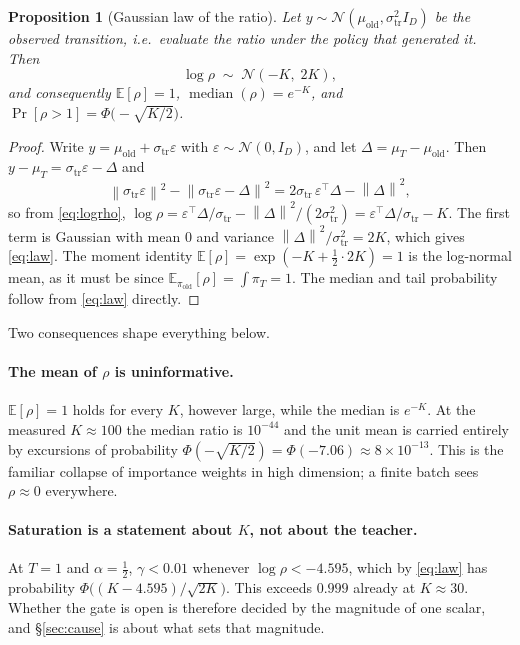 \documentclass[11pt,a4paper]{article}
\newcommand{\E}{\mathbb{E}}
\newcommand{\norm}[1]{\left\lVert #1 \right\rVert}
\newcommand{\N}{\mathcal{N}}
\newcommand{\str}{\sigma_{\mathrm{tr}}}
\newcommand{\muold}{\mu_{\mathrm{old}}}
\newcommand{\muT}{\mu_{T}}
\newtheorem{proposition}{Proposition}
\begin{document}
\begin{proposition}[Gaussian law of the ratio]
\label{prop:law}
Let $y\sim\N(\muold,\str^2 I_D)$ be the observed transition, i.e.\ evaluate the ratio under the
policy that generated it. Then
\begin{equation}
\log\rho \;\sim\; \N(-K,\;2K),
\label{eq:law}
\end{equation}
and consequently $\E[\rho]=1$, $\operatorname{median}(\rho)=e^{-K}$, and
$\Pr[\rho>1]=\Phi\big(-\sqrt{K/2}\big)$.
\end{proposition}

\begin{proof}
Write $y=\muold+\str\varepsilon$ with $\varepsilon\sim\N(0,I_D)$, and let
$\Delta=\muT-\muold$. Then $y-\muT=\str\varepsilon-\Delta$ and
\begin{equation}
\norm{\str\varepsilon}^2-\norm{\str\varepsilon-\Delta}^2
  = 2\str\,\varepsilon^{\!\top}\Delta-\norm{\Delta}^2 ,
\end{equation}
so from \eqref{eq:logrho},
$\log\rho = \varepsilon^{\!\top}\Delta/\str-\norm{\Delta}^2/(2\str^2)
          = \varepsilon^{\!\top}\Delta/\str-K$.
The first term is Gaussian with mean $0$ and variance
$\norm{\Delta}^2/\str^2=2K$, which gives \eqref{eq:law}. The moment identity
$\E[\rho]=\exp(-K+\tfrac{1}{2}\cdot 2K)=1$ is the log-normal mean, as it must be since
$\E_{\pi_{\mathrm{old}}}[\rho]=\int\pi_T=1$. The median and tail probability follow from
\eqref{eq:law} directly.
\end{proof}

Two consequences shape everything below.

\paragraph{The mean of $\rho$ is uninformative.} $\E[\rho]=1$ holds for every $K$, however
large, while the median is $e^{-K}$. At the measured $K\approx100$ the median ratio is
$10^{-44}$ and the unit mean is carried entirely by excursions of probability
$\Phi(-\sqrt{K/2})=\Phi(-7.06)\approx8\times10^{-13}$. This is the familiar collapse of
importance weights in high dimension; a finite batch sees $\rho\approx0$ everywhere.

\paragraph{Saturation is a statement about $K$, not about the teacher.} At $T=1$ and
$\alpha=\tfrac12$, $\gamma<0.01$ whenever $\log\rho<-4.595$, which by \eqref{eq:law} has
probability $\Phi\big((K-4.595)/\sqrt{2K}\big)$. This exceeds $0.999$ already at $K\approx 30$.
Whether the gate is open is therefore decided by the magnitude of one scalar, and
\S\ref{sec:cause} is about what sets that magnitude.
\end{document}
